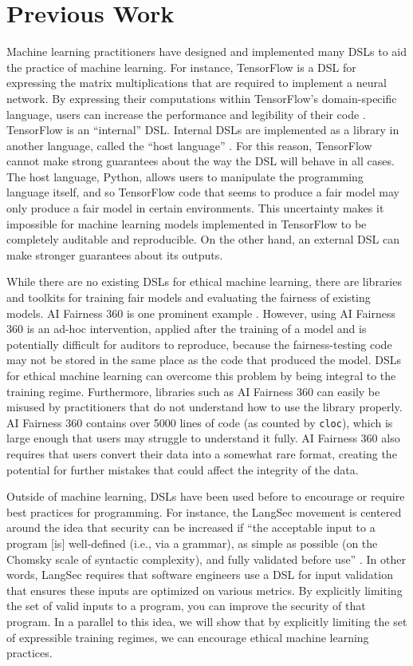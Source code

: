 \documentclass[sigconf]{acmart}
\begin{document}
\section{Previous Work}
Machine learning practitioners have designed and implemented many DSLs to aid the practice of machine learning. For instance, TensorFlow is a DSL for expressing the matrix multiplications that are required to implement a neural network. By expressing their computations within TensorFlow’s domain-specific language, users can increase the performance and legibility of their code \citep{Abadi2016}. TensorFlow is an ``internal'' DSL. Internal DSLs are implemented as a library in another language, called the ``host language'' \citep{Fowler2010}. For this reason, TensorFlow cannot make strong guarantees about the way the DSL will behave in all cases. The host language, Python, allows users to manipulate the programming language itself, and so TensorFlow code that seems to produce a fair model may only produce a fair model in certain environments. This uncertainty makes it impossible for machine learning models implemented in TensorFlow to be completely auditable and reproducible. On the other hand, an external DSL can make stronger guarantees about its outputs.

While there are no existing DSLs for ethical machine learning, there are libraries and toolkits for training fair models and evaluating the fairness of existing models. AI Fairness 360 is one prominent example \citep{Bellamy2018}. However, using AI Fairness 360 is an ad-hoc intervention, applied after the training of a model and is potentially difficult for auditors to reproduce, because the fairness-testing code may not be stored in the same place as the code that produced the model. DSLs for ethical machine learning can overcome this problem by being integral to the training regime. Furthermore, libraries such as AI Fairness 360 can easily be misused by practitioners that do not understand how to use the library properly. AI Fairness 360 contains over 5000 lines of code (as counted by \texttt{cloc}), which is large enough that users may struggle to understand it fully. AI Fairness 360 also requires that users convert their data into a somewhat rare format, creating the potential for further mistakes that could affect the integrity of the data.

Outside of machine learning, DSLs have been used before to encourage or require best practices for programming. For instance, the LangSec movement is centered around the idea that security can be increased if ``the acceptable input to a program [is] well-defined (i.e., via a grammar), as simple as possible (on the Chomsky scale of syntactic complexity), and fully validated before use'' \citep{Momot2016}. In other words, LangSec requires that software engineers use a DSL for input validation that ensures these inputs are optimized on various metrics. By explicitly limiting the set of valid inputs to a program, you can improve the security of that program. In a parallel to this idea, we will show that by explicitly limiting the set of expressible training regimes, we can encourage ethical machine learning practices.
\end{document}
